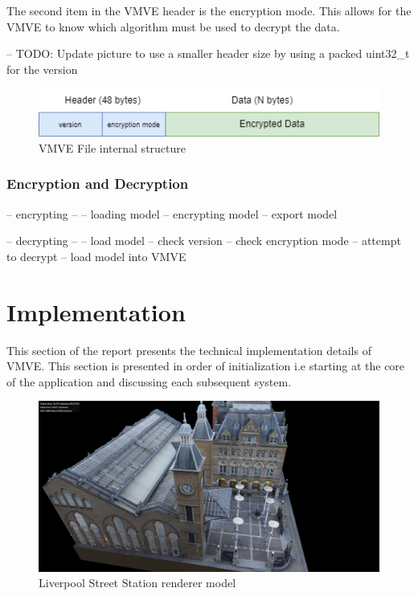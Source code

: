 \documentclass[11pt]{article}
\begin{document}
The second item in the VMVE header is the encryption mode. This allows for the VMVE to know which algorithm
must be used to decrypt the data.

-- TODO: Update picture to use a smaller header size by using a packed uint32\_t for the version

\begin{figure}[ht]
  \centering
  \includegraphics[width=\textwidth]{images/vmve_file_structure.png}
  \caption{VMVE File internal structure}
  \label{fig:vmve_file_structure}
\end{figure}


\subsubsection{Encryption and Decryption}
-- encrypting --
-- loading model
-- encrypting model
-- export model


-- decrypting --
-- load model 
-- check version
-- check encryption mode
-- attempt to decrypt
-- load model into VMVE

\section{Implementation}
This section of the report presents the technical implementation details of
VMVE. This section is presented in order of initialization i.e starting at
the core of the application and discussing each subsequent system.

\begin{figure}[h!]
  \centering
  \includegraphics[width=\textwidth]{images/rendering.png}
  \caption{Liverpool Street Station renderer model}
  \label{fig:renderer}
\end{figure}
\end{document}

